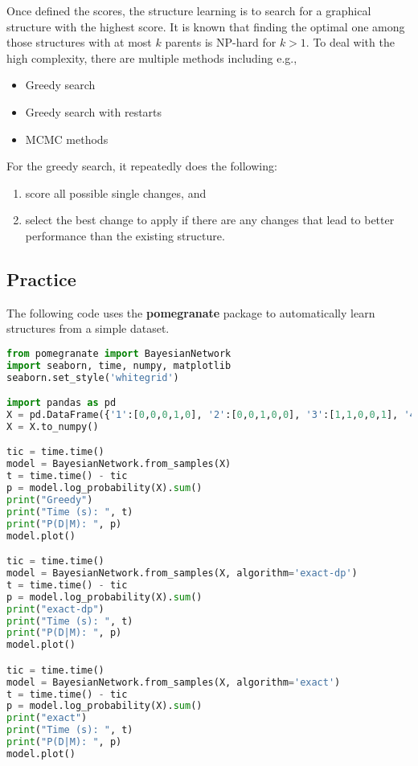 
Once defined the scores, the structure learning is to search for a graphical structure with the highest score. It is known that finding the optimal one among those structures with at most $k$ parents is NP-hard for $k>1$. To deal with the high complexity, there are multiple methods including e.g., 
\begin{itemize}
    \item Greedy search 
    \item Greedy search with restarts
    \item MCMC methods
\end{itemize}
For the greedy search, it repeatedly does the following: 
\begin{enumerate}
    \item score all possible single changes, and
    \item select the best change to apply if there are any changes that lead to better performance than the existing structure.
\end{enumerate}  


\subsection{Practice}

The following code uses the \textbf{pomegranate} package to automatically learn structures from a simple dataset. 

\begin{lstlisting}[language=Python]
from pomegranate import BayesianNetwork
import seaborn, time, numpy, matplotlib
seaborn.set_style('whitegrid')

import pandas as pd
X = pd.DataFrame({'1':[0,0,0,1,0], '2':[0,0,1,0,0], '3':[1,1,0,0,1], '4':[0,1,0,1,1]})
X = X.to_numpy()

tic = time.time()
model = BayesianNetwork.from_samples(X) 
t = time.time() - tic
p = model.log_probability(X).sum()
print("Greedy")
print("Time (s): ", t)
print("P(D|M): ", p)
model.plot()

tic = time.time()
model = BayesianNetwork.from_samples(X, algorithm='exact-dp') 
t = time.time() - tic
p = model.log_probability(X).sum()
print("exact-dp")
print("Time (s): ", t)
print("P(D|M): ", p)
model.plot()

tic = time.time()
model = BayesianNetwork.from_samples(X, algorithm='exact') 
t = time.time() - tic
p = model.log_probability(X).sum()
print("exact")
print("Time (s): ", t)
print("P(D|M): ", p)
model.plot()
\end{lstlisting}